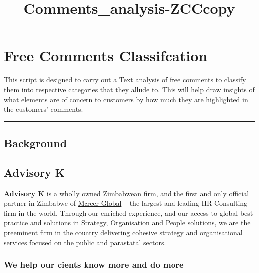 \documentclass[11pt]{article}
\title{Comments\_analysis-ZCCcopy}
\begin{document}
    
    
    \maketitle
    
    

    
    \section{Free Comments Classifcation}\label{free-comments-classifcation}

This script is designed to carry out a Text analysis of free comments to
classify them into respective categories that they allude to. This will
help draw insights of what elements are of concern to customers by how
much they are highlighted in the customers' comments.

    \begin{center}\rule{0.5\linewidth}{\linethickness}\end{center}

\subsection{Background}\label{background}

\subsection{Advisory K}\label{advisory-k}

\textbf{Advisory K} is a wholly owned Zimbabwean firm, and the first and
only official partner in Zimbabwe of \href{www.mercer.com}{Mercer
Global} -- the largest and leading HR Consulting firm in the world.
Through our enriched experience, and our access to global best practice
and solutions in Strategy, Organisation and People solutions, we are the
preeminent firm in the country delivering cohesive strategy and
organisational services focused on the public and parastatal sectors.

\subsubsection{We help our cients know more and do
more}\label{we-help-our-cients-know-more-and-do-more}
\end{document}
